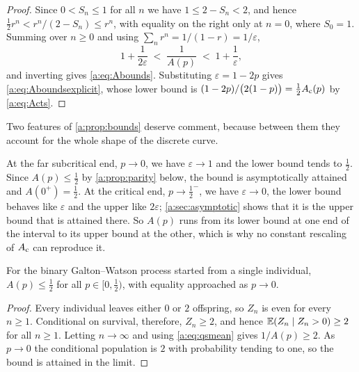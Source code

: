 \begin{proof}
Since $0<S_n\le1$ for all $n$ we have $1\le2-S_n<2$, and hence
$\tfrac12r^n < r^n/(2-S_n)\le r^n$, with equality on the right only at $n=0$, where
$S_0=1$. Summing over $n\ge0$ and using $\sum_nr^n = 1/(1-r) = 1/\varepsilon$,
\begin{equation*}
1+\frac{1}{2\varepsilon} \;<\; \frac{1}{A(p)} \;<\; 1+\frac{1}{\varepsilon},
\end{equation*}
and inverting gives \cref{a:eq:Abounds}. Substituting $\varepsilon=1-2p$ gives
\cref{a:eq:Aboundsexplicit}, whose lower bound is
$(1-2p)/\bigl(2(1-p)\bigr) = \tfrac12A_{\mathrm{c}}(p)$ by \cref{a:eq:Acts}.
\end{proof}

Two features of \cref{a:prop:bounds} deserve comment, because between them they
account for the whole shape of the discrete curve.

At the far subcritical end, $p\to0$, we have $\varepsilon\to1$ and the lower bound
tends to $\tfrac12$. Since $A(p)\le\tfrac12$ by \cref{a:prop:parity} below, the bound
is asymptotically attained and $A(0^+)=\tfrac12$. At the critical end,
$p\to\tfrac12^-$, we have $\varepsilon\to0$, the lower bound behaves like
$\varepsilon$ and the upper like $2\varepsilon$; \cref{a:sec:asymptotic} shows that
it is the upper bound that is attained there. So $A(p)$ runs from its lower bound
at one end of the interval to its upper bound at the other, which is why no
constant rescaling of $A_{\mathrm{c}}$ can reproduce it.

\begin{proposition}
\label{a:prop:parity}
For the binary Galton--Watson process started from a single individual,
$A(p)\le\tfrac12$ for all $p\in[0,\tfrac12)$, with equality approached as $p\to0$.
\end{proposition}

\begin{proof}
Every individual leaves either $0$ or $2$ offspring, so $Z_n$ is even for every
$n\ge1$. Conditional on survival, therefore, $Z_n\ge2$, and hence
$\mathbb{E}\!\left(Z_n\mid Z_n>0\right)\ge2$ for all $n\ge1$. Letting $n\to\infty$ and using
\cref{a:eq:qsmean} gives $1/A(p)\ge2$. As $p\to0$ the conditional population is $2$
with probability tending to one, so the bound is attained in the limit.
\end{proof}

